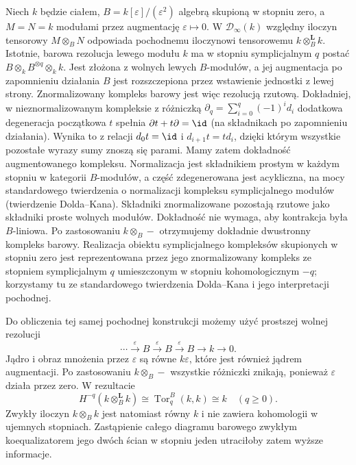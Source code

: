 \begin{przyklad}\label{cat:ex:infty-relative-tensor-dual-numbers}
Niech $k$ będzie ciałem, $B=k[\varepsilon]/(\varepsilon^2)$ algebrą skupioną w stopniu zero, a $M=N=k$ modułami przez augmentację $\varepsilon\mapsto0$. W $\mathcal D_\infty(k)$ względny iloczyn tensorowy $M\otimes_B N$ odpowiada pochodnemu iloczynowi tensorowemu $k\otimes_B^{\mathbf L}k$. Istotnie, barowa rezolucja lewego modułu $k$ ma w stopniu symplicjalnym $q$ postać $B\otimes_k B^{\otimes q}\otimes_k k$. Jest złożona z wolnych lewych $B$-modułów, a jej augmentacja po zapomnieniu działania $B$ jest rozszczepiona przez wstawienie jednostki z lewej strony. Znormalizowany kompleks barowy jest więc rezolucją rzutową. Dokładniej, w nieznormalizowanym kompleksie z różniczką $\partial_q=\sum_{i=0}^q(-1)^id_i$ dodatkowa degeneracja początkowa $t$ spełnia $\partial t+t\partial=\id$ (na składnikach po zapomnieniu działania). Wynika to z relacji $d_0t=\id$ i $d_{i+1}t=td_i$, dzięki którym wszystkie pozostałe wyrazy sumy znoszą się parami. Mamy zatem dokładność augmentowanego kompleksu. Normalizacja jest składnikiem prostym w każdym stopniu w kategorii $B$-modułów, a część zdegenerowana jest acykliczna, na mocy standardowego twierdzenia o normalizacji kompleksu symplicjalnego modułów (twierdzenie Dolda--Kana). Składniki znormalizowane pozostają rzutowe jako składniki proste wolnych modułów. Dokładność nie wymaga, aby kontrakcja była $B$-liniowa. Po zastosowaniu $k\otimes_B-$ otrzymujemy dokładnie dwustronny kompleks barowy. Realizacja obiektu symplicjalnego kompleksów skupionych w stopniu zero jest reprezentowana przez jego znormalizowany kompleks ze stopniem symplicjalnym $q$ umieszczonym w stopniu kohomologicznym $-q$; korzystamy tu ze standardowego twierdzenia Dolda--Kana i jego interpretacji pochodnej.

Do obliczenia tej samej pochodnej konstrukcji możemy użyć prostszej wolnej rezolucji
\[
 \cdots\xrightarrow{\varepsilon}B
 \xrightarrow{\varepsilon}B\xrightarrow{\varepsilon}B
 \longrightarrow k\longrightarrow0.
\]
Jądro i obraz mnożenia przez $\varepsilon$ są równe $k\varepsilon$, które jest również jądrem augmentacji. Po zastosowaniu $k\otimes_B-$ wszystkie różniczki znikają, ponieważ $\varepsilon$ działa przez zero. W rezultacie
\[
 H^{-q}(k\otimes_B^{\mathbf L}k)\cong
 \operatorname{Tor}^{B}_q(k,k)\cong k
 \quad(q\geq0).
\]
Zwykły iloczyn $k\otimes_B k$ jest natomiast równy $k$ i nie zawiera kohomologii w ujemnych stopniach. Zastąpienie całego diagramu barowego zwykłym koequalizatorem jego dwóch ścian w stopniu jeden utraciłoby zatem wyższe informacje.
\end{przyklad}

